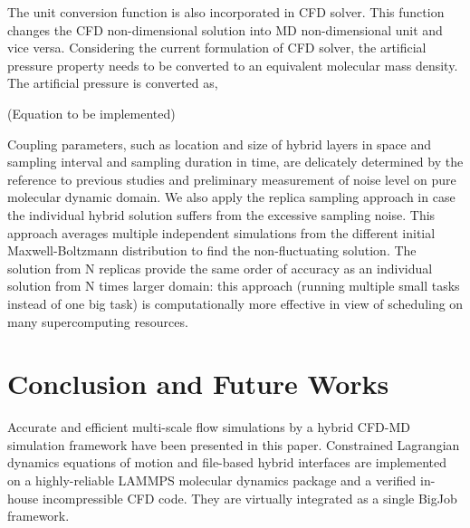 \documentclass[]{aiaa-tc}%
\begin{document}
The unit conversion function is also incorporated in CFD solver. This function changes
the CFD non-dimensional solution into MD non-dimensional unit and vice versa. 
Considering the current formulation of CFD solver, the artificial pressure property
needs to be converted to an equivalent molecular mass density. The artificial pressure
is converted as,

(Equation to be implemented)

Coupling parameters, such as location and size of hybrid layers in space and 
sampling interval and sampling duration in time, are delicately determined 
by the reference to previous studies\cite{Nie,Yen,Liu,Hadjicon2,Werder,Flekkoy,Delgado1}
and preliminary measurement of noise level on pure molecular dynamic domain.
We also apply the replica sampling approach\cite{REMD} in case the individual 
hybrid solution suffers from the excessive sampling noise. This approach averages 
multiple independent simulations from the different initial Maxwell-Boltzmann 
distribution to find the non-fluctuating solution. The solution from N replicas 
provide the same order of accuracy as an individual solution from N times larger 
domain: this approach (running multiple small tasks instead of one big task) is 
computationally more effective in view of scheduling on many supercomputing
resources.


\section{Conclusion and Future Works}
\label{sec:conclusion}


Accurate and efficient multi-scale flow simulations by a hybrid CFD-MD simulation framework have been presented in this paper. Constrained Lagrangian dynamics equations of motion and file-based hybrid interfaces are implemented on a highly-reliable LAMMPS molecular dynamics package and a verified in-house incompressible CFD code. They are virtually integrated as a single BigJob framework.
\end{document}
